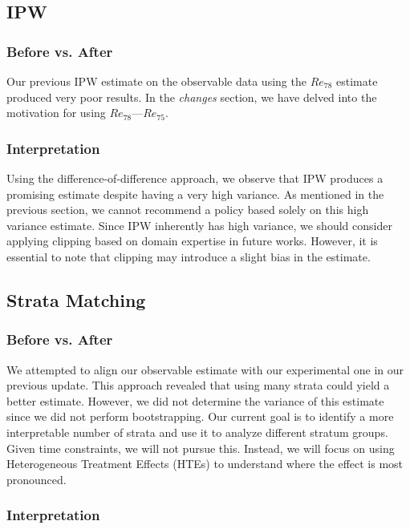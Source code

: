 \documentclass[12pt]{article}
\begin{document}
\subsection{IPW}

\subsubsection*{Before vs. After}

Our previous IPW estimate on the observable data using the $Re_78$ estimate produced very poor results. In the \textit{changes} section, we have delved into the motivation for using $Re_78—Re_75$.

\subsubsection*{Interpretation}

Using the difference-of-difference approach, we observe that IPW produces a promising estimate despite having a very high variance. As mentioned in the previous section, we cannot recommend a policy based solely on this high variance estimate. Since IPW inherently has high variance, we should consider applying clipping based on domain expertise in future works. However, it is essential to note that clipping may introduce a slight bias in the estimate.

\subsection{Strata Matching}

\subsubsection*{Before vs. After}

We attempted to align our observable estimate with our experimental one in our previous update. This approach revealed that using many strata could yield a better estimate. However, we did not determine the variance of this estimate since we did not perform bootstrapping. Our current goal is to identify a more interpretable number of strata and use it to analyze different stratum groups. Given time constraints, we will not pursue this. Instead, we will focus on using Heterogeneous Treatment Effects (HTEs) to understand where the effect is most pronounced.

\subsubsection*{Interpretation}
\end{document}
